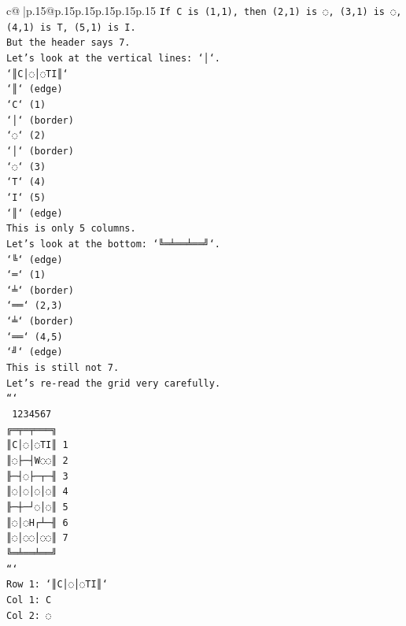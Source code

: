 \documentclass{article}
\begin{document}
{\begin{supertabular}{c@{$\;$}|p{.15\linewidth}@{}p{.15\linewidth}p{.15\linewidth}p{.15\linewidth}p{.15\linewidth}p{.15\linewidth}}
{{{\texttt{If C is (1,1), then (2,1) is ◌, (3,1) is ◌, (4,1) is T, (5,1) is I.} \\
\texttt{But the header says 7.} \\
\texttt{Let's look at the vertical lines: `│`.} \\
\texttt{`║C│◌│◌TI║`} \\
\texttt{`║` (edge)} \\
\texttt{`C` (1)} \\
\texttt{`│` (border)} \\
\texttt{`◌` (2)} \\
\texttt{`│` (border)} \\
\texttt{`◌` (3)} \\
\texttt{`T` (4)} \\
\texttt{`I` (5)} \\
\texttt{`║` (edge)} \\
\texttt{This is only 5 columns.} \\
\texttt{Let's look at the bottom: `╚═╧══╧══╝`.} \\
\texttt{`╚` (edge)} \\
\texttt{`═` (1)} \\
\texttt{`╧` (border)} \\
\texttt{`══` (2,3)} \\
\texttt{`╧` (border)} \\
\texttt{`══` (4,5)} \\
\texttt{`╝` (edge)} \\
\texttt{This is still not 7.} \\
\texttt{Let's re{-}read the grid very carefully.} \\
\texttt{```} \\
\texttt{ 1234567} \\
\texttt{╔═╤═╤═══╗} \\
\texttt{║C│◌│◌TI║ 1} \\
\texttt{║◌├─┤W◌◌║ 2} \\
\texttt{╟─┤◌├─┬─╢ 3} \\
\texttt{║◌│◌│◌│◌║ 4} \\
\texttt{╟─┼─┘◌│◌║ 5} \\
\texttt{║◌│◌H┌┴─╢ 6} \\
\texttt{║◌│◌◌│◌◌║ 7} \\
\texttt{╚═╧══╧══╝} \\
\texttt{```} \\
\texttt{Row 1: `║C│◌│◌TI║`} \\
\texttt{Col 1: C} \\
\texttt{Col 2: ◌} \\
}}}
\end{supertabular}}
\end{document}
